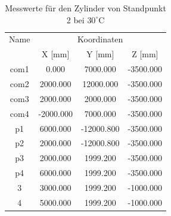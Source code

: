 \begin{table}[h]\label{tab:zylinderausd2}
\centering
\caption{Messwerte für den Zylinder von Standpunkt 2 bei $30^\circ\text{C}$}

\begin{tabular}{cccc}
\toprule
\multicolumn{1}{c|}{Name} &
\multicolumn{3}{c}{Koordinaten} \\
\multicolumn{1}{c|}{} &
\multicolumn{1}{c|}{X [mm]} &
\multicolumn{1}{c|}{Y [mm]} &
\multicolumn{1}{c}{Z [mm]} \\
\midrule

\multicolumn{1}{c|}{com1} &
\multicolumn{1}{c|}{0.000} &
\multicolumn{1}{c|}{7000.000} &
\multicolumn{1}{c}{-3500.000} \\

\multicolumn{1}{c|}{com2} &
\multicolumn{1}{c|}{2000.000} &
\multicolumn{1}{c|}{12000.000} &
\multicolumn{1}{c}{-3500.000} \\

\multicolumn{1}{c|}{com3} &
\multicolumn{1}{c|}{2000.000} &
\multicolumn{1}{c|}{2000.000} &
\multicolumn{1}{c}{-3500.000} \\

\multicolumn{1}{c|}{com4} &
\multicolumn{1}{c|}{-2000.000} &
\multicolumn{1}{c|}{7000.000} &
\multicolumn{1}{c}{-3500.000} \\

\multicolumn{1}{c|}{p1} &
\multicolumn{1}{c|}{6000.000} &
\multicolumn{1}{c|}{-12000.800} &
\multicolumn{1}{c}{-3500.000} \\

\multicolumn{1}{c|}{p2} &
\multicolumn{1}{c|}{2000.000} &
\multicolumn{1}{c|}{-12000.800} &
\multicolumn{1}{c}{-3500.000} \\

\multicolumn{1}{c|}{p3} &
\multicolumn{1}{c|}{2000.000} &
\multicolumn{1}{c|}{1999.200} &
\multicolumn{1}{c}{-3500.000} \\

\multicolumn{1}{c|}{p4} &
\multicolumn{1}{c|}{6000.000} &
\multicolumn{1}{c|}{1999.200} &
\multicolumn{1}{c}{-3500.000} \\

\multicolumn{1}{c|}{3} &
\multicolumn{1}{c|}{3000.000} &
\multicolumn{1}{c|}{1999.200} &
\multicolumn{1}{c}{-1000.000} \\

\multicolumn{1}{c|}{4} &
\multicolumn{1}{c|}{5000.000} &
\multicolumn{1}{c|}{1999.200} &
\multicolumn{1}{c}{-1000.000} \\

\bottomrule
\end{tabular}
\end{table}

